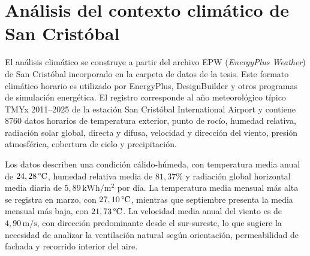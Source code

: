 \section{Análisis del contexto climático de San Cristóbal}\label{sec:clima-caso}

\begin{textoDosTercios}
El análisis climático se construye a partir del archivo EPW (\textit{EnergyPlus Weather}) de San Cristóbal incorporado en la carpeta de datos de la tesis. Este formato climático horario es utilizado por EnergyPlus, DesignBuilder y otros programas de simulación energética. El registro corresponde al año meteorológico típico TMYx 2011--2025 de la estación San Cristóbal International Airport y contiene 8760 datos horarios de temperatura exterior, punto de rocío, humedad relativa, radiación solar global, directa y difusa, velocidad y dirección del viento, presión atmosférica, cobertura de cielo y precipitación.

Los datos describen una condición cálido-húmeda, con temperatura media anual de $24,28\,\text{\textdegree C}$, humedad relativa media de $81,37\%$ y radiación global horizontal media diaria de $5,89\,\mathrm{kWh}/\mathrm{m}^{2}$ por día. La temperatura media mensual más alta se registra en marzo, con $27,10\,\text{\textdegree C}$, mientras que septiembre presenta la media mensual más baja, con $21,73\,\text{\textdegree C}$. La velocidad media anual del viento es de $4,90\,\mathrm{m/s}$, con dirección predominante desde el sur-sureste, lo que sugiere la necesidad de analizar la ventilación natural según orientación, permeabilidad de fachada y recorrido interior del aire.
\end{textoDosTercios}

